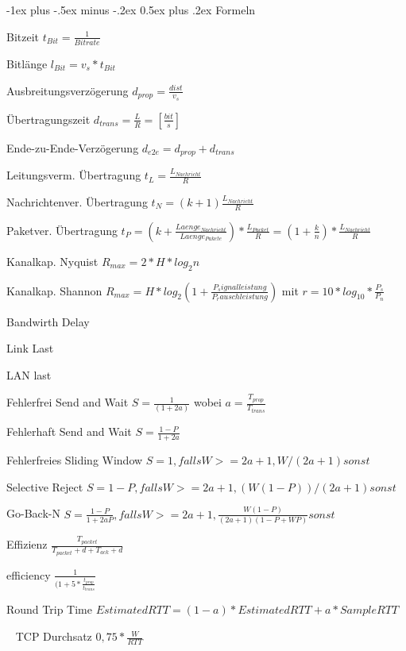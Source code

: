 \documentclass[10pt,landscape]{article}
\makeatletter
\renewcommand{\section}{\@startsection{section}{1}{0mm}%
                                {-1ex plus -.5ex minus -.2ex}%
                                {0.5ex plus .2ex}%
                                {\normalfont\large\bfseries}}
\makeatother
\begin{document}
\section{Formeln}
\begin{multicols}{2}
    Bitzeit  $t_{Bit}=\frac{1}{Bitrate}$ 
    
    Bitlänge  $l_{Bit}=v_s * t_{Bit}$ 

    Ausbreitungsverzögerung   $d_{prop} = \frac{dist}{v_s}$  
    
    Übertragungszeit  $d_{trans} = \frac{L}{R} = [\frac{bit}{s}]$ 
    
    Ende-zu-Ende-Verzögerung  $d_{e2e} = d_{prop} + d_{trans}$ 
    
    Leitungsverm. Übertragung  $t_L = \frac{L_{Nachricht}}{R}$ 
    
    Nachrichtenver. Übertragung  $t_N = (k + 1)\frac{L_{Nachricht}}{R}$ 
    
    Paketver. Übertragung  $t_{P} = (k + \frac{Laenge_{Nachricht}}{Laenge_{Pakete}})*\frac{L_{Packet}}{R} = (1+ \frac{k}{n})* \frac{L_{Nachricht}}{R}$ 
    
    Kanalkap. Nyquist  $R_{max} = 2* H * log_2n$ 
    
    Kanalkap. Shannon  $R_{max} = H* log_2(1+\frac{P_signalleistung}{P_rauschleistung})$ mit $r=10*log_{10}*{\frac{P_s}{P_n}}$ 
    
    Bandwirth Delay 

    Link Last 
    
    LAN last 
    
    Fehlerfrei Send and Wait  $S = \frac{1}{(1+2a)}$ wobei $a = \frac{T_{prop}}{T_{trans}}$ 
    
    Fehlerhaft Send and Wait  $S = \frac{1-P}{1+2a}$ 
    
    Fehlerfreies Sliding Window  $S = {1, falls W >= 2a+1, W/(2a+1) sonst}$ 
    
    Selective Reject  $S = {1-P, falls W >= 2a+1, (W(1-P))/(2a+1) sonst}$ 
    
    Go-Back-N  $S = {\frac{1-P}{1+2aP}, falls W >= 2a+1, \frac{W(1-P)}{(2a+1)(1-P+WP)} sonst}$ 
    
    Effizienz  $\frac{T_{packet} }{ T_{packet} + d + T_{ack} + d}$ 
    
    efficiency  $\frac{1}{ (1+ 5 * \frac{t_{prop}}{t_{trans}}}$ 
    
    Round Trip Time  $EstimatedRTT = (1-a) * EstimatedRTT + a * SampleRTT$ 
    
    ~ TCP Durchsatz  $ 0,75 * \frac{W}{RTT}$ 


\end{multicols}
\newpage
\end{document}
